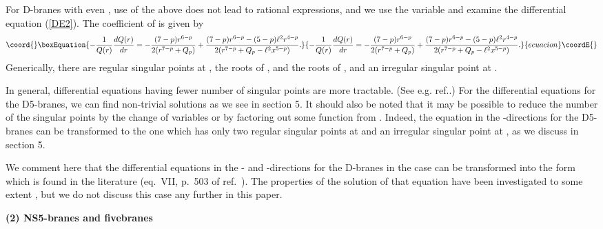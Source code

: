 \documentclass[a4paper,12pt]{article}
\begin{document}
For D\coordHE{}-branes with even \coordHE{}, use of the above \coordHE{} does
not lead to rational expressions, and we use the 
variable \coordHE{} and examine the differential equation
(\ref{DE2}). The coefficient of \coordHE{} is
given by
\begin{equation}\coord{}\boxEquation{
-{1\over Q(r)}{dQ(r)\over dr}=
-{(7-p) r^{6-p}\over 2(r^{7-p}+Q_p)}
+{(7-p)r^{6-p}-(5-p)\ell^2 r^{4-p}\over
2(r^{7-p}+Q_p-\ell^2 x^{5-p})}.
}{
-{1\over Q(r)}{dQ(r)\over dr}=
-{(7-p) r^{6-p}\over 2(r^{7-p}+Q_p)}
+{(7-p)r^{6-p}-(5-p)\ell^2 r^{4-p}\over
2(r^{7-p}+Q_p-\ell^2 x^{5-p})}.
}{ecuacion}\coordE{}\end{equation}
Generically, there are regular
singular points at \coordHE{}, the roots of \coordHE{},
and the roots of \coordHE{}, and
an irregular singular point at \coordHE{}. 

In general, differential equations having fewer number
of singular points are more tractable. (See e.g. 
ref.\cite{In}.) For the differential equations 
for the D5-branes, we can find non-trivial solutions 
as we see in section 5.
It should also be noted that it may be possible to
reduce the number of the singular points 
by the change of variables or by factoring out
some function from \coordHE{}.
Indeed, the equation in the \coordHE{}-directions for the  
D5-branes can be transformed to the one which has only 
two regular singular points at \coordHE{} and
an irregular singular point at \coordHE{}, as we discuss
in section 5. 

We comment here that the differential equations 
in the \coordHE{}- and \coordHE{}-directions for the D\coordHE{}-branes
in the \coordHE{} case can be transformed into the
form which is found in the literature (eq.~VII, p.~503 
of ref.~\cite{In}). The properties of the solution 
of that equation have been  investigated to some 
extent \cite{In2}, but we do not discuss
this case any further in this paper.
\medskip

\noindent
{\bf (2) NS5-branes and \coordHE{} fivebranes}
\medskip
\end{document}
